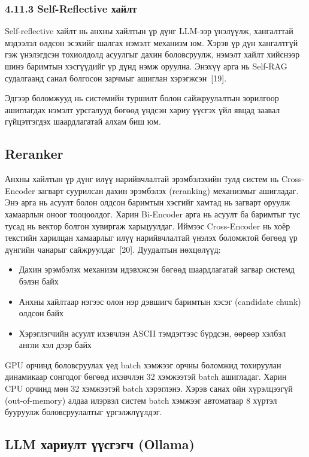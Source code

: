 \documentclass[11pt,a4paper]{article}
\begin{document}
\subsubsection*{4.11.3 Self-Reflective хайлт}

Self-reflective хайлт нь анхны хайлтын үр дүнг LLM-ээр үнэлүүлж, хангалттай мэдээлэл олдсон эсэхийг шалгах нэмэлт механизм юм. Хэрэв үр дүн хангалтгүй гэж үнэлэгдсэн тохиолдолд асуулгыг дахин боловсруулж, нэмэлт хайлт хийснээр шинэ баримтын хэсгүүдийг үр дүнд нэмж оруулна. Энэхүү арга нь Self-RAG судалгаанд санал болгосон зарчмыг ашиглан хэрэгжсэн~[19].

Эдгээр боломжууд нь системийн туршилт болон сайжруулалтын зорилгоор ашиглагдах нэмэлт урсгалууд бөгөөд үндсэн хариу үүсгэх үйл явцад заавал гүйцэтгэгдэх шаардлагатай алхам биш юм.
\subsection{Reranker}

Анхны хайлтын үр дүнг илүү нарийвчлалтай эрэмбэлэхийн тулд систем нь Cross-Encoder загварт суурилсан дахин эрэмбэлэх (reranking) механизмыг ашигладаг. Энэ арга нь асуулт болон олдсон баримтын хэсгийг хамтад нь загварт оруулж хамаарлын оноог тооцоолдог. Харин Bi-Encoder арга нь асуулт ба баримтыг тус тусад нь вектор болгон хувиргаж харьцуулдаг. Иймээс Cross-Encoder нь хоёр текстийн харилцан хамаарлыг илүү нарийвчлалтай үнэлэх боломжтой бөгөөд үр дүнгийн чанарыг сайжруулдаг~[20].
Дуудалтын нөхцөлүүд:
\begin{itemize}
    \item Дахин эрэмбэлэх механизм идэвхжсэн бөгөөд шаардлагатай загвар системд бэлэн байх
    \item Анхны хайлтаар нэгээс олон нэр дэвшигч баримтын хэсэг (candidate chunk) олдсон байх
    \item Хэрэглэгчийн асуулт ихэвчлэн ASCII тэмдэгтээс бүрдсэн, өөрөөр хэлбэл англи хэл дээр байх
\end{itemize}
GPU орчинд боловсруулах үед batch хэмжээг орчны боломжид тохируулан динамикаар сонгодог бөгөөд ихэвчлэн 32 хэмжээтэй batch ашигладаг. Харин CPU орчинд мөн 32 хэмжээтэй batch хэрэглэнэ. Хэрэв санах ойн хүрэлцээгүй (out-of-memory) алдаа илэрвэл систем batch хэмжээг автоматаар 8 хүртэл бууруулж боловсруулалтыг үргэлжлүүлдэг.
\subsection{LLM хариулт үүсгэгч (Ollama)}
\end{document}
